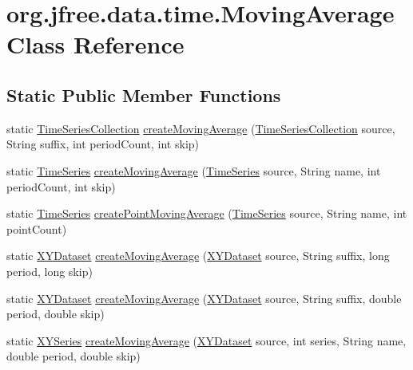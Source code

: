 \hypertarget{classorg_1_1jfree_1_1data_1_1time_1_1_moving_average}{}\section{org.\+jfree.\+data.\+time.\+Moving\+Average Class Reference}
\label{classorg_1_1jfree_1_1data_1_1time_1_1_moving_average}
\subsection*{Static Public Member Functions}
\begin{DoxyCompactItemize}
\item 
static \mbox{\hyperlink{classorg_1_1jfree_1_1data_1_1time_1_1_time_series_collection}{Time\+Series\+Collection}} \mbox{\hyperlink{classorg_1_1jfree_1_1data_1_1time_1_1_moving_average_af22d5280cf3f80e287b9615029470bb3}{create\+Moving\+Average}} (\mbox{\hyperlink{classorg_1_1jfree_1_1data_1_1time_1_1_time_series_collection}{Time\+Series\+Collection}} source, String suffix, int period\+Count, int skip)
\item 
static \mbox{\hyperlink{classorg_1_1jfree_1_1data_1_1time_1_1_time_series}{Time\+Series}} \mbox{\hyperlink{classorg_1_1jfree_1_1data_1_1time_1_1_moving_average_a0f89bebd759c2c288a2b58c12a189070}{create\+Moving\+Average}} (\mbox{\hyperlink{classorg_1_1jfree_1_1data_1_1time_1_1_time_series}{Time\+Series}} source, String name, int period\+Count, int skip)
\item 
static \mbox{\hyperlink{classorg_1_1jfree_1_1data_1_1time_1_1_time_series}{Time\+Series}} \mbox{\hyperlink{classorg_1_1jfree_1_1data_1_1time_1_1_moving_average_ad1b56541558ce41cbaec344d0249e472}{create\+Point\+Moving\+Average}} (\mbox{\hyperlink{classorg_1_1jfree_1_1data_1_1time_1_1_time_series}{Time\+Series}} source, String name, int point\+Count)
\item 
static \mbox{\hyperlink{interfaceorg_1_1jfree_1_1data_1_1xy_1_1_x_y_dataset}{X\+Y\+Dataset}} \mbox{\hyperlink{classorg_1_1jfree_1_1data_1_1time_1_1_moving_average_a40bd4099f2d493b5e1128f601932f861}{create\+Moving\+Average}} (\mbox{\hyperlink{interfaceorg_1_1jfree_1_1data_1_1xy_1_1_x_y_dataset}{X\+Y\+Dataset}} source, String suffix, long period, long skip)
\item 
static \mbox{\hyperlink{interfaceorg_1_1jfree_1_1data_1_1xy_1_1_x_y_dataset}{X\+Y\+Dataset}} \mbox{\hyperlink{classorg_1_1jfree_1_1data_1_1time_1_1_moving_average_af6a16d6e3c7ba55b45cb2dcbf8b43d11}{create\+Moving\+Average}} (\mbox{\hyperlink{interfaceorg_1_1jfree_1_1data_1_1xy_1_1_x_y_dataset}{X\+Y\+Dataset}} source, String suffix, double period, double skip)
\item 
static \mbox{\hyperlink{classorg_1_1jfree_1_1data_1_1xy_1_1_x_y_series}{X\+Y\+Series}} \mbox{\hyperlink{classorg_1_1jfree_1_1data_1_1time_1_1_moving_average_a8ac3b98c7078190abba76d73f6fe9252}{create\+Moving\+Average}} (\mbox{\hyperlink{interfaceorg_1_1jfree_1_1data_1_1xy_1_1_x_y_dataset}{X\+Y\+Dataset}} source, int series, String name, double period, double skip)
\end{DoxyCompactItemize}


